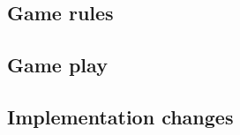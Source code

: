 \subsection{Game rules}\label{subsec:future:rules}


\subsection{Game play}\label{subsec:future:play}


\subsection{Implementation changes}\label{subsec:future:impl}

